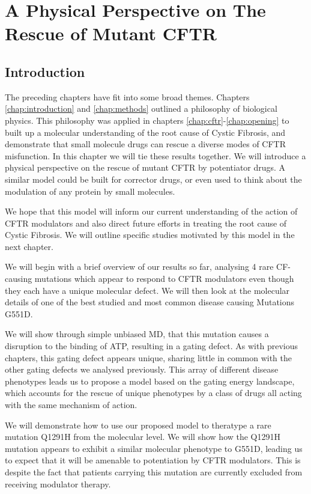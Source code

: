 \chapter{A Physical Perspective on The Rescue of Mutant CFTR}
\label{chap:perspective}

\section{Introduction}

The preceding chapters have fit into some broad themes. Chapters \ref{chap:introduction} and \ref{chap:methods} outlined a philosophy of biological physics. This philosophy was applied in chapters \ref{chap:cftr}-\ref{chap:opening} to built up a molecular understanding of the root cause of Cystic Fibrosis, and demonstrate that small molecule drugs can rescue a diverse modes of CFTR misfunction. In this chapter we will tie these results together. We will introduce a physical perspective on the rescue of mutant CFTR by potentiator drugs. A similar model could be built for corrector drugs, or even used to think about the modulation of any protein by small molecules.

We hope that this model will inform our current understanding of the action of CFTR modulators and also direct future efforts in treating the root cause of Cystic Fibrosis. We will outline specific studies motivated by this model in the next chapter.

We will begin with a brief overview of our results so far, analysing 4 rare CF-causing mutations which appear to respond to CFTR modulators even though they each have a unique molecular defect. We will then look at the molecular details of one of the best studied and most common disease causing Mutations G551D. 

We will show through simple unbiased MD, that this mutation causes a disruption to the binding of ATP, resulting in a gating defect. As with previous chapters, this gating defect appears unique, sharing little in common with the other gating defects we analysed previously. This array of different disease phenotypes leads us to propose a model based on the gating energy landscape, which accounts for the rescue of unique phenotypes by a class of drugs all acting with the same mechanism of action. 

We will demonstrate how to use our proposed model to theratype a rare mutation Q1291H from the molecular level. We will show how the Q1291H mutation appears to exhibit a similar molecular phenotype to G551D, leading us to expect that it will be amenable to potentiation by CFTR modulators. This is despite the fact that patients carrying this mutation are currently excluded from receiving modulator therapy. 

